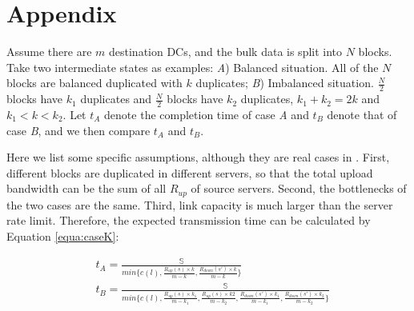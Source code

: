 \section{Appendix}
Assume there are $m$ destination DCs, and the bulk data is split into $N$ blocks.
Take two intermediate states as examples: {\em A}) Balanced situation. All of the $N$ blocks are balanced duplicated with $k$ duplicates; {\em B}) Imbalanced situation. $\frac{N}{2}$ blocks have $k_1$ duplicates and $\frac{N}{2}$ blocks have $k_2$ duplicates, $k_1+k_2=2k$ and $k_1<k<k_2$. Let $t_A$ denote the completion time of case {\em A} and $t_B$ denote that of case {\em B}, and we then compare $t_A$ and $t_B$.
%
%

Here we list some specific assumptions, although they are real cases in \company. First, different blocks are duplicated in different servers, so that the total upload bandwidth can be the sum of all $R_{up}$ of source servers. Second, the bottlenecks of the two cases are the same. Third, link capacity is much larger than the server rate limit. Therefore, the expected transmission time can be calculated by Equation \ref{equa:caseK}:
 

\begin{equation}
\label{equa:caseK}
\begin{split}
& t_A = \frac{\mathbb{S}}{min\{c(l),\frac{R_{up}(s)\times k}{m-k},\frac{R_{down}(s')\times k}{m-k}\}}\\
& t_B = \frac{\mathbb{S}}{min\{c(l),\frac{R_{up}(s)\times k_1}{m-k_1},\frac{R_{up}(s)\times k2}{m-k_2},\frac{R_{down}(s')\times k_1}{m-k_1},\frac{R_{down}(s')\times k_2}{m-k_2}\}}\\
\end{split}
\end{equation}

